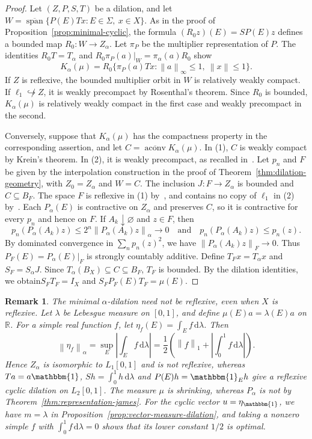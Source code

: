 \documentclass[11pt,leqno]{amsart}
\theoremstyle{compact}
\numberwithin{equation}{section}
\theoremstyle{compactremark}
\newtheorem{remark}[theorem]{Remark}
\theoremstyle{compact}
\def\cspan{\overline{\operatorname{span}}}
\newcommand{\1}{\mathbbm{1}}
\newcommand{\rmd}{\mathrm{d}}
\newcommand{\R}{\mathbb{R}}
\newcommand{\norm}[1]{\left\|#1\right\|}
\newcommand{\abs}[1]{\left|#1\right|}
\begin{document}
\begin{proof}
Let $(Z,P,S,T)$ be a dilation, and let $W=\cspan\{P(E)Tx:E\in\Sigma,\ x\in X\}$. As in the proof of Proposition~\ref{prop:minimal-cyclic}, the formula $(R_0z)(E)=SP(E)z$ defines a bounded map $R_0\colon W\to Z_\alpha$. Let $\pi_P$ be the multiplier representation of $P$. The identities $R_0T=T_\alpha$ and $R_0\pi_P(a)|_W=\pi_\alpha(a)R_0$ show
\[
K_\alpha(\mu)=R_0\{\pi_P(a)Tx:\norm{a}_\infty\leq1,\ \norm{x}\leq1\}.
\]
If $Z$ is reflexive, the bounded multiplier orbit in $W$ is relatively weakly compact. If $\ell_1\not\hookrightarrow Z$, it is weakly precompact by Rosenthal's theorem. Since $R_0$ is bounded, $K_\alpha(\mu)$ is relatively weakly compact in the first case and weakly precompact in the second.

Conversely, suppose that $K_\alpha(\mu)$ has the compactness property in the corresponding assertion, and let $C=\overline{\operatorname{aconv}}K_\alpha(\mu)$. In (1), $C$ is weakly compact by Krein's theorem. In (2), it is weakly precompact, as recalled in~\cite[Section~4]{AvilesGuiraoLajaraRodriguezTradacete2016}. Let $p_n$ and $F$ be given by the interpolation construction in the proof of Theorem~\ref{thm:dilation-geometry}, with $Z_0=Z_\alpha$ and $W=C$. The inclusion $J\colon F\to Z_\alpha$ is bounded and $C\subseteq B_F$. The space $F$ is reflexive in (1) by~\cite[Lemma~1]{DFJP1974}, and contains no copy of $\ell_1$ in (2) by~\cite[Section~4]{AvilesGuiraoLajaraRodriguezTradacete2016}. Each $P_\alpha(E)$ is contractive on $Z_\alpha$ and preserves $C$, so it is contractive for every $p_n$ and hence on $F$. If $A_k\downarrow\varnothing$ and $z\in F$, then
\[
p_n(P_\alpha(A_k)z)\leq2^n\norm{P_\alpha(A_k)z}_\alpha\longrightarrow0
\quad\text{and}\quad p_n(P_\alpha(A_k)z)\leq p_n(z).
\]
By dominated convergence in $\sum_np_n(z)^2$, we have $\norm{P_\alpha(A_k)z}_F\to0$. Thus $P_F(E)=P_\alpha(E)|_F$ is strongly countably additive. Define $T_Fx=T_\alpha x$ and $S_F=S_\alpha J$. Since $T_\alpha(B_X)\subseteq C\subseteq B_F$, $T_F$ is bounded. By the dilation identities, we obtain$S_FT_F=I_X$ and $S_FP_F(E)T_F=\mu(E)$.
\end{proof}
\par\endgroup

\begingroup
\begin{remark}\label{rem:scalar-minimal}
The minimal $\alpha$-dilation need not be reflexive, even when $X$ is reflexive. Let $\lambda$ be Lebesgue measure on $[0,1]$, and define $\mu(E)a=\lambda(E)a$ on $\R$. For a simple real function $f$, let $\eta_f(E)=\int_Ef\,\rmd\lambda$. Then
\[
\norm{\eta_f}_\alpha=\sup_E\abs{\int_Ef\,\rmd\lambda}=\frac{1}{2}\left(\norm{f}_1+\abs{\int_0^1f\,\rmd\lambda}\right).
\]
Hence $Z_\alpha$ is isomorphic to $L_1[0,1]$ and is not reflexive, whereas $Ta=a\1$, $Sh=\int_0^1h\,\rmd\lambda$ and $P(E)h=\1_Eh$ give a reflexive cyclic dilation on $L_2[0,1]$. The measure $\mu$ is shrinking, whereas $P_\alpha$ is not by Theorem~\ref{thm:representation-james}. For the cyclic vector $u=\eta_{\1}$, we have $m=\lambda$ in Proposition~\ref{prop:vector-measure-dilation}, and taking a nonzero simple $f$ with $\int_0^1f\,\rmd\lambda=0$ shows that its lower constant $1/2$ is optimal.
\end{remark}
\endgroup
\end{document}
